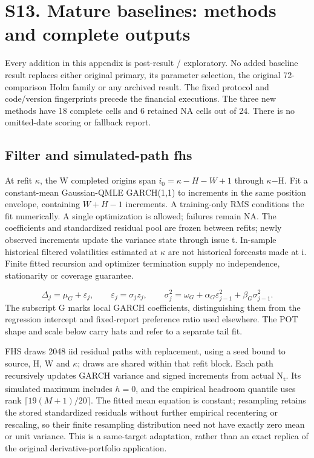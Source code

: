 \documentclass[11pt,a4paper]{article}
\begin{document}
\section*{S13. Mature baselines: methods and complete outputs}
Every addition in this appendix is post-result / exploratory. No added baseline result replaces either original primary, its parameter selection, the original 72-comparison Holm family or any archived result. The fixed protocol and code/version fingerprints precede the financial executions. The three new methods have 18 complete cells and 6 retained NA cells out of 24. There is no omitted-date scoring or fallback report.

\subsection*{Filter and simulated-path fhs}
At refit \(\kappa\), the W completed origins span \(i_0=\kappa-H-W+1\) through \(\kappa\)\(-\)H. Fit a constant-mean Gaussian-QMLE GARCH(1,1) to increments in the same position envelope, containing \(W+H-1\) increments. A training-only RMS conditions the fit numerically. A single optimization is allowed; failures remain NA. The coefficients and standardized residual pool are frozen between refits; newly observed increments update the variance state through issue t. In-sample historical filtered volatilities estimated at \(\kappa\) are not historical forecasts made at i. Finite fitted recursion and optimizer termination supply no independence, stationarity or coverage guarantee.

\[
\Delta_j=\mu_G+\varepsilon_j,\qquad\varepsilon_j=\sigma_j z_j,\qquad\sigma_j^2=\omega_G+\alpha_G\varepsilon_{j-1}^2+\beta_G\sigma_{j-1}^2.
\]
The subscript G marks local GARCH coefficients, distinguishing them from the regression intercept and fixed-report preference ratio used elsewhere. The POT shape and scale below carry hats and refer to a separate tail fit.

FHS draws 2048 iid residual paths with replacement, using a seed bound to source, H, W and \(\kappa\); draws are shared within that refit block. Each path recursively updates GARCH variance and signed increments from actual N\textsubscript{t}. Its simulated maximum includes \(h=0\), and the empirical headroom quantile uses rank \(\lceil19(M+1)/20\rceil\). The fitted mean equation is constant; resampling retains the stored standardized residuals without further empirical recentering or rescaling, so their finite resampling distribution need not have exactly zero mean or unit variance. This is a same-target adaptation, rather than an exact replica of the original derivative-portfolio application.
\end{document}
